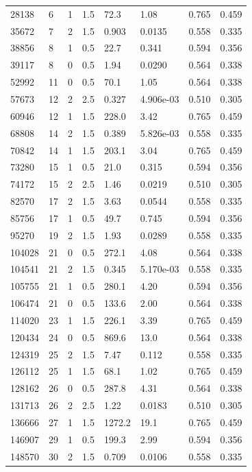 \documentclass[preview]{standalone}
\begin{document}
{{\begin{tabular}{L{1.2cm}C{1.2cm} C{0.3cm}C{0.5cm} C{1.4cm}C{1.4cm} C{1.4cm}C{1.4cm}}
  28138  &     6  & 1     & 1.5 &  72.3  & 1.08  & 0.765 &  0.459   \\ 
  35672  &     7  & 2     & 1.5 &  0.903  & 0.0135  & 0.558 &  0.335   \\ 
  38856  &     8  & 1     & 0.5 &  22.7  & 0.341  & 0.594 &  0.356   \\ 
  39117  &     8  & 0     & 0.5 &  1.94  & 0.0290  & 0.564 &  0.338   \\ 
  52992  &    11  & 0     & 0.5 &  70.1  & 1.05  & 0.564 &  0.338   \\ 
  57673  &    12  & 2     & 2.5 &  0.327  & 4.906e-03  & 0.510 &  0.305   \\ 
  60946  &    12  & 1     & 1.5 &  228.0  & 3.42  & 0.765 &  0.459   \\ 
  68808  &    14  & 2     & 1.5 &  0.389  & 5.826e-03  & 0.558 &  0.335   \\ 
  70842  &    14  & 1     & 1.5 &  203.1  & 3.04  & 0.765 &  0.459   \\ 
  73280  &    15  & 1     & 0.5 &  21.0  & 0.315  & 0.594 &  0.356   \\ 
  74172  &    15  & 2     & 2.5 &  1.46  & 0.0219  & 0.510 &  0.305   \\ 
  82570  &    17  & 2     & 1.5 &  3.63  & 0.0544  & 0.558 &  0.335   \\ 
  85756  &    17  & 1     & 0.5 &  49.7  & 0.745  & 0.594 &  0.356   \\ 
  95270  &    19  & 2     & 1.5 &  1.93  & 0.0289  & 0.558 &  0.335   \\ 
  104028  &    21  & 0     & 0.5 &  272.1  & 4.08  & 0.564 &  0.338   \\ 
  104541  &    21  & 2     & 1.5 &  0.345  & 5.170e-03  & 0.558 &  0.335   \\ 
  105755  &    21  & 1     & 0.5 &  280.1  & 4.20  & 0.594 &  0.356   \\ 
  106474  &    21  & 0     & 0.5 &  133.6  & 2.00  & 0.564 &  0.338   \\ 
  114020  &    23  & 1     & 1.5 &  226.1  & 3.39  & 0.765 &  0.459   \\ 
  120434  &    24  & 0     & 0.5 &  869.6  & 13.0  & 0.564 &  0.338   \\ 
  124319  &    25  & 2     & 1.5 &  7.47  & 0.112  & 0.558 &  0.335   \\ 
  126112  &    25  & 1     & 1.5 &  68.1  & 1.02  & 0.765 &  0.459   \\ 
  128162  &    26  & 0     & 0.5 &  287.8  & 4.31  & 0.564 &  0.338   \\ 
  131713  &    26  & 2     & 2.5 &  1.22  & 0.0183  & 0.510 &  0.305   \\ 
  136666  &    27  & 1     & 1.5 &  1272.2  & 19.1  & 0.765 &  0.459   \\ 
  146907  &    29  & 1     & 0.5 &  199.3  & 2.99  & 0.594 &  0.356   \\ 
  148570  &    30  & 2     & 1.5 &  0.709  & 0.0106  & 0.558 &  0.335   \\ 
\hline 
\end{tabular} 

}}
\end{document}
